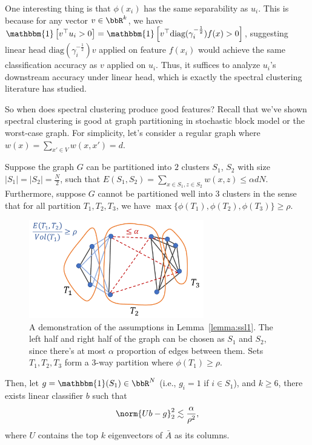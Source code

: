 \newcommand{\id}[1]{\mathbbm{1}\left[#1\right]}

One interesting thing is that $\phi(x_i)$ has the same separability as $u_i$. This is because for any vector $v\in\bbR^k$, we have $\id{v^\top u_i>0} = \id{v^\top \text{diag}(\gamma_i^{-\frac{1}{2}}) f(x) >0}$, suggesting linear head $\text{diag}(\gamma_i^{-\frac{1}{2}}) v$ applied on feature $f(x_i)$ would achieve the same classification accuracy as $v$ applied on $u_i$. Thus, it suffices to analyze $u_i$'s downstream accuracy under linear head, which is exactly the spectral clustering literature has studied.

So when does spectral clustering produce good features? Recall that we've shown spectral clustering is good at graph partitioning in stochastic block model or the worst-case graph. For simplicity, let's consider a regular graph where $w(x) = \sum_{x'\in V} w(x, x') = d$. 

\begin{lemma}\label{lemma:ssl1}
	Suppose the graph $G$ can be partitioned into $2$ clusters $S_1$, $S_2$ with size $|S_1| = |S_2| = \frac{N}{2}$, such that $E(S_1, S_2)=\sum_{x\in S_1, z\in S_2} w(x, z) \le \alpha dN$. Furthermore, suppose $G$ cannot be partitioned well into $3$ clusters in the sense that for all partition $ T_1, T_2, T_3$, we have $\max\{\phi(T_1), \phi(T_2), \phi(T_3)\} \ge \rho$. 
	\begin{figure}[ht]
		\centering
		\includegraphics[width=3in]{figures/ssl4.pdf}
		\caption{A demonstration of the assumptions in Lemma~\ref{lemma:ssl1}. The left half and right half of the graph can be chosen as $S_1$ and $S_2$, since there's at most $\alpha$ proportion of edges between them. Sets $T_1, T_2, T_3$ form a 3-way partition where $\phi(T_1)\ge \rho$.
		}
	\end{figure}
	
	Then, let $g=\mathbbm{1}(S_1)\in \bbR^N$ (i.e., $g_i=1$ if $i\in S_1$), and $k\ge 6$, there exists linear classifier $b$ such that 
	\begin{align}
		\norm{Ub-g}_2^2 \lesssim \frac{\alpha}{\rho^2},
	\end{align}
where $U$ contains the top $k$ eigenvectors of $\bar{A}$ as its columns.
\end{lemma}

